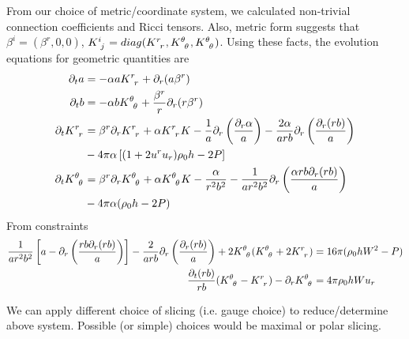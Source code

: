 \documentclass[prd]{revtex4}
\newcommand*\apost{\textsc{\char13}}
\begin{document}
From our choice of metric/coordinate system, we calculated non-trivial connection coefficients and Ricci tensors. Also, metric form suggests that $\beta^i = (\beta^r,0,0)$, $K\indices{^i_j} = diag(K\indices{^r_r}, K\indices{^\theta_\theta},K\indices{^\theta_\theta})$. Using these facts, the evolution equations for geometric quantities are
\begin{align}
\partial_t a &= - \alpha a K\indices{^r_r} + \partial_r (a \beta^r) \\
\partial_t b &= - \alpha b K\indices{^\theta_\theta} + \frac{\beta^r}{r} \partial_r (r \beta^r) \\
\partial_t K\indices{^r_r} &= \beta^r \partial_r K\indices{^r_r} + \alpha K\indices{^r_r} K - \frac{1}{a} \partial_r \left( \frac{\partial_r \alpha}{a} \right) - \frac{2 \alpha}{arb} \partial_r \left( \frac{\partial_r (rb)}{a} \right) \nonumber \\
& - 4 \pi \alpha \left[ (1+2 u^r u_r) \rho_0 h - 2P \right] \\
\partial_t K\indices{^\theta_\theta} &= \beta^r \partial_r K\indices{^\theta_\theta} + \alpha K\indices{^\theta_\theta} K - \frac{\alpha}{r^2 b^2} - \frac{1}{ar^2b^2} \partial_r \left( \frac{\alpha r b \partial_r (rb)}{a} \right) \nonumber \\
& - 4 \pi \alpha (\rho_0 h -2 P)
\end{align}
From constraints
\begin{align}
 \frac{1}{ar^2b^2} \left[a-\partial_r \left(\frac{rb \partial_r (rb)}{a} \right) \right] -\frac{2}{arb} \partial_r \left(\frac{\partial_r (rb)}{a} \right) + 2K\indices{^\theta_\theta}(K\indices{^\theta_\theta}+2 K\indices{^r_r}) &= 16 \pi (\rho_0 h W^2 -P) \nonumber \\
 \frac{\partial_t (r b)}{rb} (K\indices{^\theta_\theta} - K\indices{^r_r}) - \partial_r K\indices{^\theta_\theta} &= 4 \pi \rho_0 h W u_r
\end{align}

We can apply different choice of slicing (i.e. gauge choice) to reduce/determine above system. Possible (or simple) choices would be maximal or polar slicing. 

\end{document}
